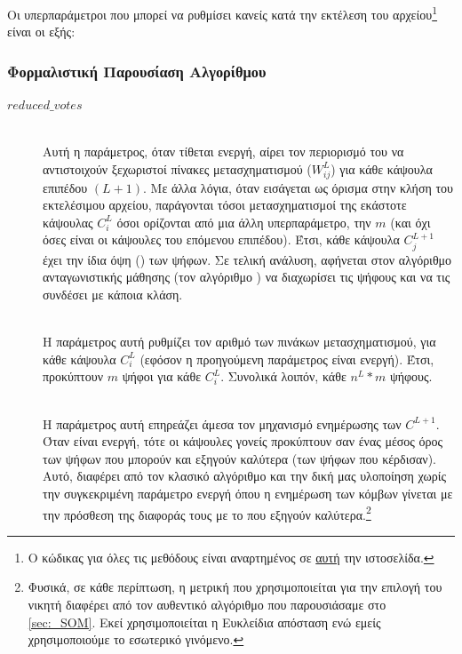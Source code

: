 Οι υπερπαράμετροι που μπορεί να ρυθμίσει κανείς κατά την εκτέλεση του αρχείου\footnote{Ο κώδικας για όλες τις μεθόδους είναι αναρτημένος σε \href{https://github.com/abarmper/Capsule_Nets_with_uncertainty}{αυτή} την ιστοσελίδα.} είναι οι εξής:



\subsubsection{Φορμαλιστική Παρουσίαση Αλγορίθμου}


\begin{description}
  \item[$reduced\_votes$] \hfill \\ Αυτή η παράμετρος, όταν τίθεται ενεργή, αίρει τον περιορισμό του να αντιστοιχούν ξεχωριστοί πίνακες μετασχηματισμού ($W_{ij}^L$) για κάθε κάψουλα επιπέδου $(L+1)$. Με άλλα λόγια, όταν εισάγεται ως όρισμα στην κλήση του εκτελέσιμου αρχείου, παράγονται τόσοι μετασχηματισμοί της εκάστοτε κάψουλας $C_i^L$ όσοι ορίζονται από μια άλλη υπερπαράμετρο, την $m$ (και όχι όσες είναι οι κάψουλες του επόμενου επιπέδου). Έτσι, κάθε κάψουλα $C^{L+1}_j$ έχει την ίδια όψη () των ψήφων. Σε τελική ανάλυση, αφήνεται στον αλγόριθμο ανταγωνιστικής μάθησης (τον αλγόριθμο ) να διαχωρίσει τις ψήφους και να τις συνδέσει με κάποια κλάση.
  
  \item[] \hfill \\ Η παράμετρος αυτή ρυθμίζει τον αριθμό των πινάκων μετασχηματισμού, για κάθε κάψουλα $C_i^L$ (εφόσον η προηγούμενη παράμετρος είναι ενεργή). Έτσι, προκύπτουν $m$ ψήφοι για κάθε $C_i^L$. Συνολικά λοιπόν, κάθε   $n^L \ast m$ ψήφους.
  
  \item[] \hfill \\ Η παράμετρος αυτή επηρεάζει άμεσα τον μηχανισμό ενημέρωσης των $C^{L+1}$. Όταν είναι ενεργή, τότε οι κάψουλες γονείς προκύπτουν σαν ένας μέσος όρος των ψήφων που μπορούν και εξηγούν καλύτερα (των ψήφων που κέρδισαν). Αυτό, διαφέρει από τον κλασικό αλγόριθμο  και την δική μας υλοποίηση χωρίς την συγκεκριμένη παράμετρο ενεργή όπου η ενημέρωση των κόμβων γίνεται με την πρόσθεση της διαφοράς τους με το  που εξηγούν καλύτερα.\footnote{Φυσικά, σε κάθε περίπτωση, η μετρική που χρησιμοποιείται για την επιλογή του νικητή διαφέρει από τον αυθεντικό αλγόριθμο που παρουσιάσαμε στο \ref{sec:_SOM}. Εκεί χρησιμοποιείται η Ευκλείδια απόσταση ενώ εμείς χρησιμοποιούμε το εσωτερικό γινόμενο.}
  

\end{description}
